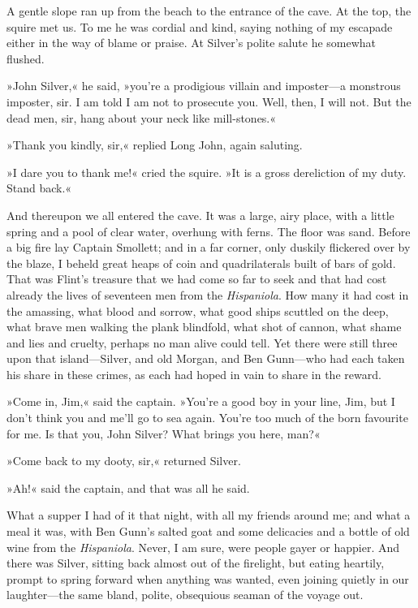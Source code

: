 A gentle slope ran up from the beach to the entrance of the cave. At the top, the squire met us. To me he was cordial and kind, saying nothing of my escapade either in the way of blame or praise. At Silver's polite salute he somewhat flushed.

»John Silver,« he said, »you're a prodigious villain and imposter—a monstrous imposter, sir. I am told I am not to prosecute you. Well, then, I will not. But the dead men, sir, hang about your neck like mill-stones.«

»Thank you kindly, sir,« replied Long John, again saluting.

»I dare you to thank me!« cried the squire. »It is a gross dereliction of my duty. Stand back.«

And thereupon we all entered the cave. It was a large, airy place, with a little spring and a pool of clear water, overhung with ferns. The floor was sand. Before a big fire lay Captain Smollett; and in a far corner, only duskily flickered over by the blaze, I beheld great heaps of coin and quadrilaterals built of bars of gold. That was Flint's treasure that we had come so far to seek and that had cost already the lives of seventeen men from the \textit{Hispaniola}. How many it had cost in the amassing, what blood and sorrow, what good ships scuttled on the deep, what brave men walking the plank blindfold, what shot of cannon, what shame and lies and cruelty, perhaps no man alive could tell. Yet there were still three upon that island—Silver, and old Morgan, and Ben Gunn—who had each taken his share in these crimes, as each had hoped in vain to share in the reward.

»Come in, Jim,« said the captain. »You're a good boy in your line, Jim, but I don't think you and me'll go to sea again. You're too much of the born favourite for me. Is that you, John Silver? What brings you here, man?«

»Come back to my dooty, sir,« returned Silver.

»Ah!« said the captain, and that was all he said.

What a supper I had of it that night, with all my friends around me; and what a meal it was, with Ben Gunn's salted goat and some delicacies and a bottle of old wine from the \textit{Hispaniola}. Never, I am sure, were people gayer or happier. And there was Silver, sitting back almost out of the firelight, but eating heartily, prompt to spring forward when anything was wanted, even joining quietly in our laughter—the same bland, polite, obsequious seaman of the voyage out.